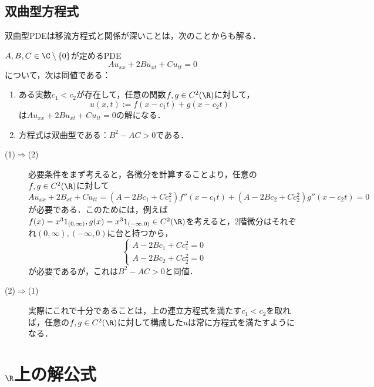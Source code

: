 \documentclass[uplatex,dvipdfmx]{jsreport}
\begin{document}
\subsection{双曲型方程式}

\begin{tcolorbox}[colframe=ForestGreen, colback=ForestGreen!10!white,breakable,colbacktitle=ForestGreen!40!white,coltitle=black,fonttitle=\bfseries\sffamily,
title=]
    双曲型PDEは移流方程式と関係が深いことは，次のことからも解る．
\end{tcolorbox}

\begin{proposition}
    $A,B,C\in\C\setminus\{0\}$が定めるPDE
    \[Au_{xx}+2Bu_{xt}+Cu_{tt}=0\]
    について，次は同値である：
    \begin{enumerate}
        \item ある実数$c_1<c_2$が存在して，任意の関数$f,g\in C^2(\R)$に対して，
        \[u(x,t):=f(x-c_1t)+g(x-c_2t)\]
        は$Au_{xx}+2Bu_{xt}+Cu_{tt}=0$の解になる．
        \item 方程式は双曲型である：$B^2-AC>0$である．
    \end{enumerate}
\end{proposition}
\begin{Proof}\mbox{}
    \begin{description}
        \item[(1)$\Rightarrow$(2)] 必要条件をまず考えると，各微分を計算することより，任意の$f,g\in C^2(\R)$に対して
        \[Au_{xx}+2B_{xt}+Cu_{tt}=(A-2Bc_1+Cc_1^2)f''(x-c_1t)+(A-2Bc_2+Cc_2^2)g''(x-c_2t)=0\]
        が必要である．このためには，例えば$f(x)=x^31_{(0,\infty)},g(x)=x^31_{(-\infty,0)}\in C^2(\R)$を考えると，2階微分はそれぞれ$(0,\infty),(-\infty,0)$に台と持つから，
        \[\begin{cases}
            A-2Bc_1+Cc_1^2=0\\
            A-2Bc_2+Cc_2^2=0
        \end{cases}\]
        が必要であるが，これは$B^2-AC>0$と同値．
        \item[(2)$\Rightarrow$(1)] 実際にこれで十分であることは，上の連立方程式を満たす$c_1<c_2$を取れば，任意の$f,g\in C^2(\R)$に対して構成した$u$は常に方程式を満たすようになる．
    \end{description}
\end{Proof}

\section{$\R$上の解公式}
\end{document}
